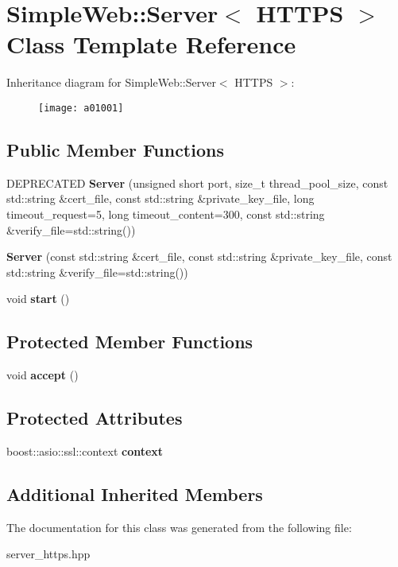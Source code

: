 \hypertarget{a01001}{}\section{Simple\+Web\+:\+:Server$<$ H\+T\+T\+PS $>$ Class Template Reference}
\label{a01001}
Inheritance diagram for Simple\+Web\+:\+:Server$<$ H\+T\+T\+PS $>$\+:\begin{figure}[H]
\begin{center}
\leavevmode
\texttt{[image: a01001]}
\end{center}
\end{figure}
\subsection*{Public Member Functions}
\begin{DoxyCompactItemize}
\item 
\mbox{\label{a01001_a1a5530e96cd973de3dc987034ca61b54}} 
D\+E\+P\+R\+E\+C\+A\+T\+ED {\bfseries Server} (unsigned short port, size\+\_\+t thread\+\_\+pool\+\_\+size, const std\+::string \&cert\+\_\+file, const std\+::string \&private\+\_\+key\+\_\+file, long timeout\+\_\+request=5, long timeout\+\_\+content=300, const std\+::string \&verify\+\_\+file=std\+::string())
\item 
\mbox{\label{a01001_a15bb179287dfaa18da16b8877174e8d6}} 
{\bfseries Server} (const std\+::string \&cert\+\_\+file, const std\+::string \&private\+\_\+key\+\_\+file, const std\+::string \&verify\+\_\+file=std\+::string())
\item 
\mbox{\label{a01001_a6a740b3fdbbbf178f540e27942cc93fc}} 
void {\bfseries start} ()
\end{DoxyCompactItemize}
\subsection*{Protected Member Functions}
\begin{DoxyCompactItemize}
\item 
\mbox{\label{a01001_af722d2884eafafada7073feb7793c422}} 
void {\bfseries accept} ()
\end{DoxyCompactItemize}
\subsection*{Protected Attributes}
\begin{DoxyCompactItemize}
\item 
\mbox{\label{a01001_ade0b1e6f826fd76ba6c6253d352fd93c}} 
boost\+::asio\+::ssl\+::context {\bfseries context}
\end{DoxyCompactItemize}
\subsection*{Additional Inherited Members}


The documentation for this class was generated from the following file\+:\begin{DoxyCompactItemize}
\item 
server\+\_\+https.\+hpp\end{DoxyCompactItemize}
